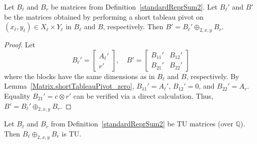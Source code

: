 \begin{lemma}
    \label{standardReprSum2_shortTableauPivot}
    \leanok
    Let $B_{\ell}$ and $B_{r}$ be matrices from Definition~\ref{standardReprSum2}. Let $B_{\ell}'$ and $B'$ be the matrices obtained by performing a short tableau pivot on $(x_{\ell}, y_{\ell}) \in X_{\ell} \times Y_{\ell}$ in $B_{\ell}$ and $B$, respectively. Then $B' = B_{\ell}' \oplus_{2, x, y} B_{r}$.
\end{lemma}

\begin{proof}
    \leanok
    Let
    \[
        B_{\ell}' = \begin{bmatrix} A_{\ell}' \\ r' \end{bmatrix}, \quad
        B' = \begin{bmatrix} B_{11}' & B_{12}' \\ B_{21}' & B_{22}' \end{bmatrix}
    \]
    where the blocks have the same dimensions as in $B_{\ell}$ and $B$, respectively. By Lemma~\ref{Matrix.shortTableauPivot_zero}, $B_{11}' = A_{\ell}'$, $B_{12}' = 0$, and $B_{22}' = A_{r}$. Equality $B_{21}' = c \otimes r'$ can be verified via a direct calculation. Thus, $B' = B_{\ell}' \oplus_{2, x, y} B_{r}$.
\end{proof}

\begin{lemma}
    \label{standardReprSum2_isTotallyUnimodular}
    \leanok
    Let $B_{\ell}$ and $B_{r}$ from Definition~\ref{standardReprSum2} be TU matrices (over $\mathbb{Q}$). Then $B_{\ell} \oplus_{2, x, y} B_{r}$ is TU.
\end{lemma}

